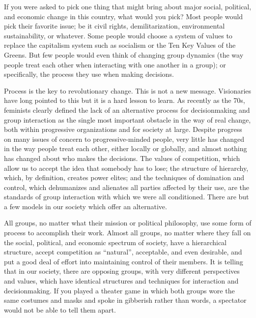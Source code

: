 If you were asked to pick one thing that might bring about major
social, political, and economic change in this country, what would
you pick?  Most people would pick their favorite issue; be it
civil rights, demilitarization, environmental sustainability, or
whatever.  Some people would choose a system of values to replace
the capitalism system such as socialism or the Ten Key Values of
the Greens.  But few people would even think of changing group
dynamics (the way people treat each other when interacting with
one another in a group); or specifically, the process they use
when making decisions.

Process is the key to revolutionary change.  This is not a new
message.  Visionaries have long pointed to this but it is a hard
lesson to learn.  As recently as the 70s, feminists clearly
defined the lack of an alternative process for decisionmaking and
group interaction as the single most important obstacle in the way
of real change, both within progressive organizations and for
society at large.  Despite progress on many issues of concern to
progressive-minded people, very little has changed in the way
people treat each other, either locally or globally, and almost
nothing has changed about who makes the decisions.  The values of
competition, which allow us to accept the idea that somebody has
to lose; the structure of hierarchy, which, by definition, creates
power elites; and the techniques of domination and control, which
dehumanizes and alienates all parties affected by their use, are
the standards of group interaction with which we were all
conditioned.  There are but a few models in our society which
offer an alternative.

All groups, no matter what their mission or political philosophy,
use some form of process to accomplish their work.  Almost all
groups, no matter where they fall on the social, political, and
economic spectrum of society, have a hierarchical structure,
accept competition as ``natural'', acceptable, and even
desirable, and put a good deal of effort into maintaining control
of their members.  It is telling that in our society, there are
opposing groups, with very different perspectives and values,
which have identical structures and techniques for interaction and
decisionmaking.  If you played a theater game in which both groups
wore the same costumes and masks and spoke in gibberish rather
than words, a spectator would not be able to tell them apart.

